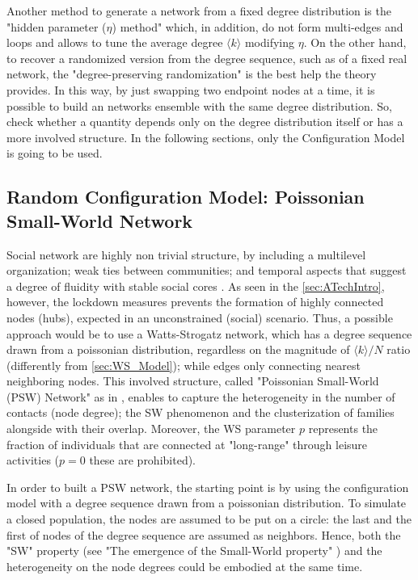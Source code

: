 \documentclass[a4paper,12pt,twoside]{book} %
\theoremstyle{definition}
\begin{document}
Another method to generate a network from a fixed degree distribution is the "hidden parameter ($\eta$) method" which, in addition, do not form multi-edges and loops \cite{barabasi::2016networkbook} and allows to tune the average degree $\langle k \rangle$ modifying $\eta$.
On the other hand, to recover a randomized version from the degree sequence, such as of a fixed real network, the "degree-preserving randomization" is the best help the theory provides. In this way, by just swapping two endpoint nodes at a time, it is possible to build an networks ensemble with the same degree distribution. So, check whether a quantity depends only on the degree distribution itself or has a more involved structure.
In the following sections, only the Configuration Model is going to be used.

\clearpage
\subsection{Random Configuration Model: Poissonian Small-World Network}
\label{sec:PSW_network}
Social network are highly non trivial structure, by including a multilevel organization; weak ties between communities; and temporal aspects that suggest a degree of fluidity with stable social cores \cite{Thurner::NetBasedExpl}.
As seen in the \autoref{sec:ATechIntro}, however, the lockdown measures prevents the formation of highly connected nodes (hubs), expected in an unconstrained (social) scenario. Thus, a possible approach would be to use a Watts-Strogatz network, which has a degree sequence drawn from a poissonian distribution, regardless on the magnitude of $\langle k \rangle / N$ ratio (differently from \autoref{sec:WS_Model}); while edges only connecting nearest neighboring nodes.
This involved structure, called "Poissonian Small-World (PSW) Network" as in \cite{Thurner::NetBasedExpl}, enables to capture the heterogeneity in the number of contacts (node degree); the SW phenomenon and the clusterization of families alongside with their overlap. Moreover, the WS parameter $p$ represents the fraction of individuals that are connected at "long-range" through leisure activities ($p = 0$ these are prohibited).

In order to built a PSW network, the starting point is by using the configuration model with a degree sequence drawn from a poissonian distribution. To simulate a closed population, the nodes are assumed to be put on a circle: the last and the first of nodes of the degree sequence are assumed as neighbors. Hence, both the "SW" property (see "The emergence of the Small-World property" ) and the heterogeneity on the node degrees could be embodied at the same time. 
\end{document}
